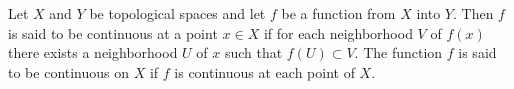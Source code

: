 Let $X$ and $Y$ be topological spaces and let $f$ be a function from $X$ into $Y$. Then $f$ is said to be continuous at a point $x \in X$ if for each neighborhood $V$ of $f(x)$ there exists a neighborhood $U$ of $x$ such that $f(U) \subset V$. The function $f$ is said to be continuous on $X$ if $f$ is continuous at each point of $X$.